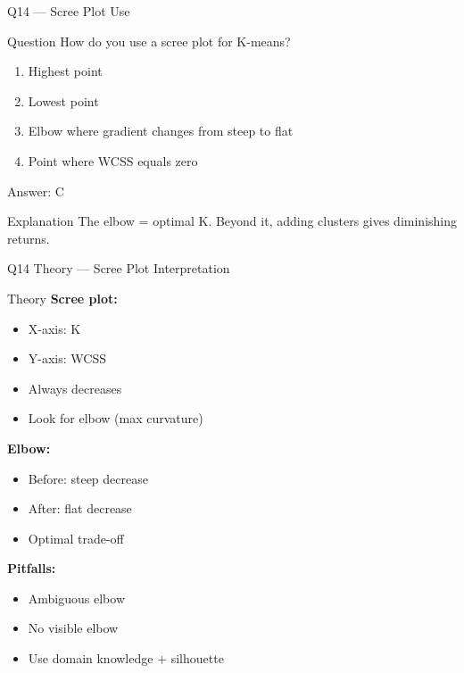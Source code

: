 \documentclass[aspectratio=169,8pt]{beamer}
\begin{document}
	\begin{frame}{Q14 --- Scree Plot Use}
		\begin{block}{Question}
			How do you use a scree plot for K-means?
		\end{block}
		\begin{enumerate}[label=\Alph*.]
			\item Highest point
			\item Lowest point
			\item Elbow where gradient changes from steep to flat
			\item Point where WCSS equals zero
		\end{enumerate}
		\begin{exampleblock}{Answer: C}
		\end{exampleblock}
		\begin{block}{Explanation}
			The elbow = optimal K. Beyond it, adding clusters gives diminishing returns.
		\end{block}
	\end{frame}
	
	\begin{frame}{Q14 Theory --- Scree Plot Interpretation}
		\begin{block}{Theory}
			\textbf{Scree plot:}
			\begin{itemize}
				\item X-axis: K
				\item Y-axis: WCSS
				\item Always decreases
				\item Look for elbow (max curvature)
			\end{itemize}
			\textbf{Elbow:}
			\begin{itemize}
				\item Before: steep decrease
				\item After: flat decrease
				\item Optimal trade-off
			\end{itemize}
			\textbf{Pitfalls:}
			\begin{itemize}
				\item Ambiguous elbow
				\item No visible elbow
				\item Use domain knowledge + silhouette
			\end{itemize}
		\end{block}
	\end{frame}
	
\end{document}
